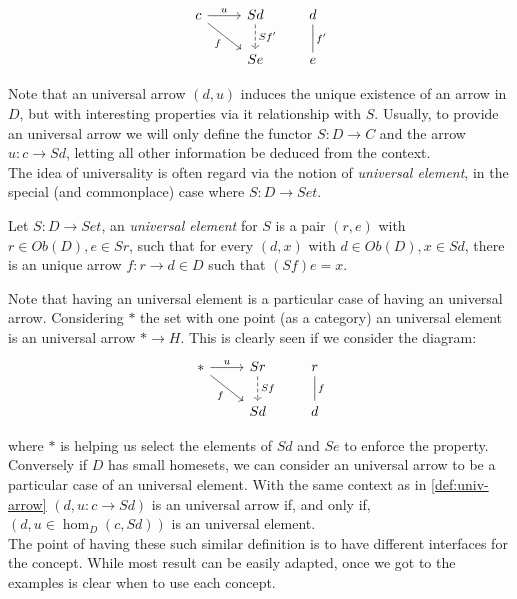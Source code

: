 \[
  \begin{tikzcd}
      c\arrow[r, "u"] \arrow[rd, "f", swap]      & Sd \arrow[d, "Sf'", dashed]& d\arrow[d,"f'",dash]\\
       &Se& e 
    \end{tikzcd}
  \]

  Note that an universal arrow $(d,u)$ induces the unique existence of an arrow in $D$, but with interesting properties via it relationship with $S$. Usually, to provide an universal arrow we will only define the functor $S:D\to C$ and the arrow $u:c\to Sd$, letting all other information be deduced from the context.\\



  The idea of universality is often regard via the notion of \emph{universal element}, in the special (and commonplace) case where $S:D\to Set$.

  \begin{definition}
    Let $S: D \to Set$, an \emph{universal element}  for $S$ is a pair $(r,e)$ with $r \in Ob(D), e \in   Sr$, such that for every $(d,x)$ with $d\in Ob(D), x\in Sd$, there is an unique arrow $f:r\to d\in D$ such that $(Sf)e = x$. 
  \end{definition}


    Note that having an universal element is a particular case of having an universal arrow. Considering $*$ the set with one point (as a category) an universal element is an universal arrow $*\to H$. This is clearly seen if we consider the diagram:
    \[
  \begin{tikzcd}
     *\arrow[r, "u"] \arrow[rd, "f", swap] & Sr \arrow[d, "Sf", dashed]& r\arrow[d,"f", dash]\\
      &Sd& d 
    \end{tikzcd}
  \]

  where $*$ is helping us select the elements of $Sd$ and $Se$ to enforce the property.\\

  Conversely if $D$ has small homesets, we can consider an universal arrow to be a particular case of an universal element. With the same context as in \ref{def:univ-arrow} $(d,u: c\to Sd)$ is an universal arrow if, and only if, $(d, u\in  \hom_{D}(c, Sd))$ is an universal element.\\

  The point of having these such similar definition is to have different interfaces for the concept. While most result can be easily adapted, once we got to the examples is clear when to use each concept. 
  
